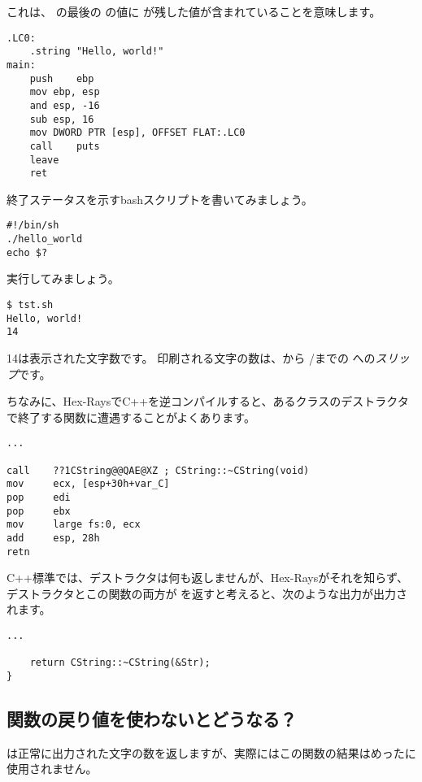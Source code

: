 これは、 \main の最後の \EAX の値に \puts が残した値が含まれていることを意味します。

\begin{lstlisting}[caption=GCC 4.8.1,style=customasmx86]
.LC0:
	.string	"Hello, world!"
main:
	push	ebp
	mov	ebp, esp
	and	esp, -16
	sub	esp, 16
	mov	DWORD PTR [esp], OFFSET FLAT:.LC0
	call	puts
	leave
	ret
\end{lstlisting}


終了ステータスを示すbashスクリプトを書いてみましょう。

\begin{lstlisting}[caption=tst.sh]
#!/bin/sh
./hello_world
echo $?
\end{lstlisting}

実行してみましょう。

\begin{lstlisting}
$ tst.sh 
Hello, world!
14
\end{lstlisting}

14は表示された文字数です。
印刷される文字の数は、\printf から /までの への\textit{スリップ}です。


ちなみに、Hex-RaysでC++を逆コンパイルすると、あるクラスのデストラクタで終了する関数に遭遇することがよくあります。

\begin{lstlisting}[style=customasmx86]
...

call    ??1CString@@QAE@XZ ; CString::~CString(void)
mov     ecx, [esp+30h+var_C]
pop     edi
pop     ebx
mov     large fs:0, ecx
add     esp, 28h
retn
\end{lstlisting}

C++標準では、デストラクタは何も返しませんが、Hex-Raysがそれを知らず、
デストラクタとこの関数の両方が \Tint を返すと考えると、次のような出力が出力されます。

\begin{lstlisting}[style=customc]
...

	return CString::~CString(&Str);
}
\end{lstlisting}

\subsection{関数の戻り値を使わないとどうなる？}

\printf は正常に出力された文字の数を返しますが、実際にはこの関数の結果はめったに使用されません。

